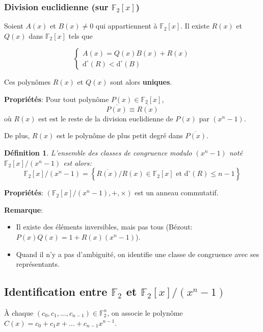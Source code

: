\documentclass[a4paper,10pt,twocolumn]{article}
\theoremstyle{break}
\newcommand{\F}{\mathbb{F}}
\newcommand{\FF}{\F_2}
\newcommand{\FFn}[1]{\FF^{#1}}
\newcommand{\dg}[1]{\mathrm{d}^\circ(#1)}
\newtheorem{mydef}{Définition}
\newenvironment{note}[1]
{\textbf{#1}:}
{}
\newenvironment{remarque}
{\begin{note}{Remarque}}
{\end{note}}
\newenvironment{proprietes}
{\begin{note}{Propriétés}}
{\end{note}}
\begin{document}
\subsubsection{Division euclidienne (sur $\FF[x]$)}

Soient $A(x)$ et $B(x) \ne 0$ qui appartiennent à $\FF[x]$. Il existe $R(x)$ et $Q(x)$ dans $\FF[x]$ tels que

$$ \left\{ \begin{array}{l}
A(x) = Q(x)B(x)+R(x) \\
\dg{R} < \dg{B}
\end{array} \right. $$

Ces polynômes $R(x)$ et $Q(x)$ sont alors \textbf{uniques}.

\begin{proprietes}
 Pour tout polynôme $P(x) \in \FF[x]$,
 $$ \overline{P(x)} \equiv \overline{R(x)} $$
 où $R(x)$ est est le reste de la division euclidienne de $P(x)$ par $(x^n - 1)$.

 De plus, $R(x)$ est le polynôme de plus petit degré dans $\overline{P(x)}$.
\end{proprietes}

\begin{mydef}
 L'ensemble des classes de congruence modulo $(x^n - 1)$ noté $\FF[x]/(x^n-1)$ est alors:
 $$ \FF[x] / (x^n-1) = \left\{ \overline{R(x)} / R(x) \in \FF[x] \text{ et }\dg{R} \le n-1 \right\} $$ 
\end{mydef}

\begin{proprietes}
$(\FF[x]/(x^n - 1), +, \times)$ est un anneau commutatif.
\end{proprietes}

\begin{remarque}
 \begin{itemize}
 \item Il existe des éléments inversibles, mais pas tous (Bézout: $P(x)Q(x) = 1 + R(x)(x^n-1)$).
 \item Quand il n'y a pas d'ambiguité, on identifie une classe de congruence avec ses représentants.
 \end{itemize}
\end{remarque}

\subsection{Identification entre $\FF$ et $\FF[x]/(x^n-1)$}
À chaque $(c_0, c_1, \ldots, c_{n-1}) \in \FFn{n}$, on associe le polynôme 
$C(x) = c_0 + c_1x + \ldots + c_{n-1}x^{n-1}$.
\end{document}
